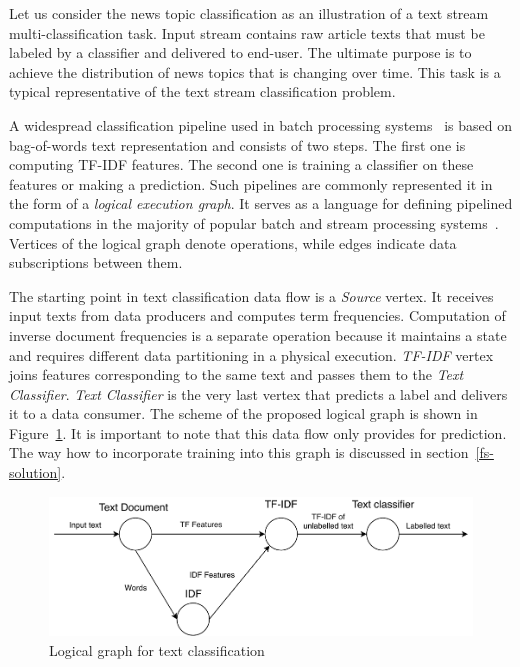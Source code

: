 \label{fs-framework}

Let us consider the news topic classification as an illustration of a text stream multi-classification task. Input stream contains raw article texts that must be labeled by a classifier and delivered to end-user. The ultimate purpose is to achieve the distribution of news topics that is changing over time. This task is a typical representative of the text stream classification problem.

A widespread classification pipeline used in batch processing systems~\cite{semberecki2016distributed} is based on bag-of-words text representation and consists of two steps. The first one is computing TF-IDF features. The second one is training a classifier on these features or making a prediction. Such pipelines are commonly represented it in the form of a {\em logical execution graph}. It serves as a language for defining pipelined computations in the majority of popular batch and stream processing systems~\cite{Carbone:2017:SMA:3137765.3137777, Zaharia:2016:ASU:3013530.2934664, apache:storm, Kulkarni:2015:THS:2723372.2742788, Noghabi:2017:SSS:3137765.3137770}. Vertices of the logical graph denote operations, while edges indicate data subscriptions between them. 

The starting point in text classification data flow is a {\em Source} vertex. It receives input texts from data producers and computes term frequencies. Computation of inverse document frequencies is a separate operation because it maintains a state and requires different data partitioning in a physical execution. {\em TF-IDF} vertex joins features corresponding to the same text and passes them to the {\em Text Classifier}. {\em Text Classifier} is the very last vertex that predicts a label and delivers it to a data consumer. The scheme of the proposed logical graph is shown in Figure~\ref{logical_graph}. It is important to note that this data flow only provides for prediction. The way how to incorporate training into this graph is discussed in section~\ref{fs-solution}.

\begin{figure}[htbp]
  \centering
  \includegraphics[scale=0.52]{pics/logical-graph-no-part-fit}
  \caption{Logical graph for text classification}
  \label {logical_graph}
\end{figure}

